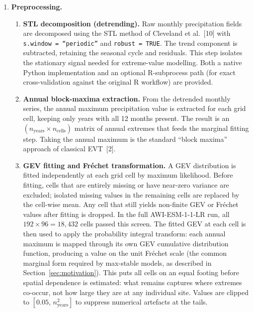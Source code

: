 \documentclass[preprint,12pt,a4paper]{elsarticle}
\newcommand{\rev}[1]{{#1}}
\newcommand{\revr}[1]{{#1}}
\begin{document}
\begin{enumerate}
\item \textbf{\rev{Preprocessing.}}
  \begin{enumerate}
  \item[\textbf{(a)}] \textbf{\rev{STL decomposition (detrending).}}
    \rev{Raw monthly precipitation fields are decomposed using the
    STL method of Cleveland et al.~[10] with \texttt{s.window =
    ``periodic''} and \texttt{robust = TRUE}.  The trend component is
    subtracted, retaining the seasonal cycle and residuals. This step
    isolates the stationary signal needed for extreme-value
    modelling. Both a native Python implementation and an optional
    R-subprocess path (for exact cross-validation against the
    original R workflow) are provided.}
  \item[\textbf{(b)}] \textbf{\rev{Annual block-maxima extraction.}}
    \rev{From the detrended monthly series, the annual maximum
    precipitation value is extracted for each grid cell, keeping
    only years with all 12 months present. The result is an
    $(n_{\text{years}} \times n_{\text{cells}})$ matrix of annual
    extremes that feeds the marginal fitting step. Taking the
    annual maximum is the standard ``block maxima'' approach of
    classical EVT~[2].}
  \item[\textbf{(c)}] \textbf{\rev{GEV fitting and Fr\'{e}chet
    transformation.}}
    \rev{A GEV distribution is fitted independently at each grid cell
    by maximum likelihood. Before fitting, cells that are entirely
    missing or have near-zero variance are excluded; isolated missing
    values in the remaining cells are replaced by the cell-wise mean.
    Any cell that still yields non-finite GEV or Fr\'{e}chet values
    after fitting is dropped. In the full AWI-ESM-1-1-LR run, all
    $192 \times 96 = 18{,}432$ cells passed this screen. The fitted
    GEV at each cell is then used to apply the probability integral
    transform: each annual maximum is mapped through its own GEV
    cumulative distribution function, producing a value on the
    unit Fr\'{e}chet scale (the common marginal form required by
    max-stable models, as described in Section~\ref{sec:motivation}).
    \revr{This puts all cells on an equal footing before spatial
    dependence is estimated: what remains captures where extremes
    co-occur, not how large they are at any individual site.}
    Values are clipped to $[0.05,\, n_{\text{years}}^{2}]$ to
    suppress numerical artefacts at the tails.}
  \end{enumerate}

\end{enumerate}
\end{document}
